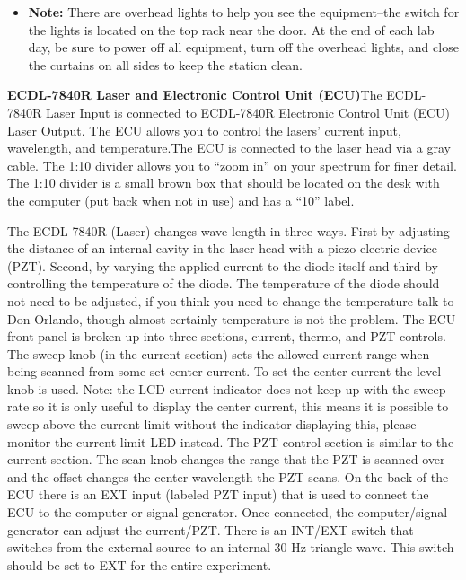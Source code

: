 \documentclass{../lab}
\begin{document}
\begin{itemize}
    \item \textbf{Note:} There are overhead lights to help you see the equipment--the switch for the lights is located on the top rack near the door. At the end of each lab day, be sure to power off all equipment, turn off the overhead lights, and close the curtains on all sides to keep the station clean.

\end{itemize}

\textbf{ECDL-7840R Laser and Electronic Control Unit (ECU)}The ECDL-7840R Laser Input is connected to ECDL-7840R Electronic Control Unit (ECU) Laser Output. The ECU allows you to control the lasers' current input, wavelength, and temperature.The ECU is connected to the laser head via a gray cable. The 1:10 divider allows you to ``zoom in'' on your spectrum for finer detail. The 1:10 divider is a small brown box that should be located on the desk with the computer (put back when not in use) and has a ``10'' label.

The ECDL-7840R (Laser) changes wave length in three ways. First by adjusting the distance of an internal cavity in the laser head with a piezo electric device (PZT). Second, by varying the applied current to the diode itself and third by controlling the temperature of the diode. The temperature of the diode should not need to be adjusted, if you think you need to change the temperature talk to Don Orlando, though almost certainly temperature is not the problem. The ECU front panel is broken up into three sections, current, thermo, and PZT controls. The sweep knob (in the current section) sets the allowed current range when being scanned from some set center current. To set the center current the level knob is used. Note: the LCD current indicator does not keep up with the sweep rate so it is only useful to display the center current, this means it is possible to sweep above the current limit without the indicator displaying this, please monitor the current limit LED instead. The PZT control section is similar to the current section. The scan knob changes the range that the PZT is scanned over and the offset changes the center wavelength the PZT scans. On the back of the ECU there is an EXT input (labeled PZT input) that is used to connect the ECU to the computer or signal generator. Once connected, the computer/signal generator can adjust the current/PZT. There is an INT/EXT switch that switches from the external source to an internal 30 Hz triangle wave. This switch should be set to EXT for the entire experiment.
\end{document}
